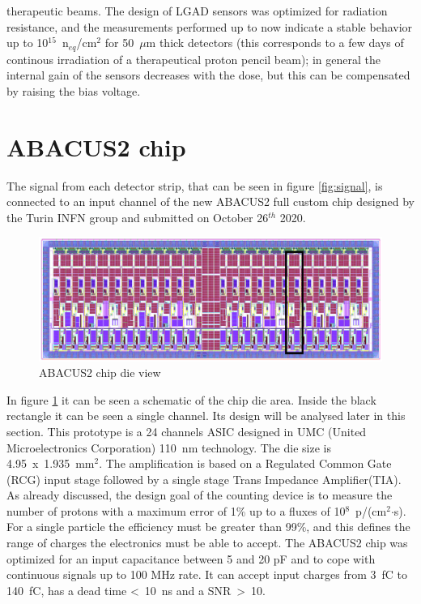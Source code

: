 therapeutic beams. The design of LGAD sensors was optimized for radiation
resistance, and the measurements performed up to now indicate a stable behavior up to 10$^{15}$~n$_{eq}$/cm$^2$ for 50~$\mu$m thick detectors
(this corresponds to a few days of continous irradiation of a therapeutical proton pencil beam);
in general the internal gain
of the sensors decreases with the dose, but this can be compensated by raising the bias voltage.


\section{ABACUS2 chip}\label{chip}
\noindent The signal from each detector strip, that can be seen in figure \ref{fig:signal}, is connected to an input channel of the new ABACUS2 full custom chip\cite{abacus}\cite{dac} designed by the Turin INFN group and submitted on October 26$^{th}$ 2020.
\begin{figure}[H]
	\centering
	\includegraphics[width=0.9\linewidth]{IMG/ch2/ABACUS2.png}
	\caption{ABACUS2 chip die view}
	\label{fig:abacus2}
\end{figure}
\noindent In figure \ref{fig:abacus2} it can be seen a schematic of the chip die area. Inside the black rectangle it can be seen a single channel. Its design will be analysed later in this section.
This prototype is a 24 channels ASIC designed in UMC (United Microelectronics Corporation) 110~nm technology.
The die size is 4.95~x~1.935~mm$^2$.
The amplification is based on a Regulated Common Gate (RCG) input stage followed by a single stage Trans Impedance Amplifier(TIA).\\
As already discussed, the design goal of the counting device is to measure the number of protons with a maximum error of 1\% up to a fluxes of 10$^8$~p/(cm$^2$$\cdot$s).
For a single particle the efficiency must be greater than 99\%, and this defines the range of charges the electronics must be able to accept.
The ABACUS2 chip was optimized for an input capacitance between 5 and 20 pF and to cope with continuous signals up to 100 MHz rate.
It can accept input charges from 3~fC to 140~fC, has a dead time <~10~ns and a SNR~>~10. 

